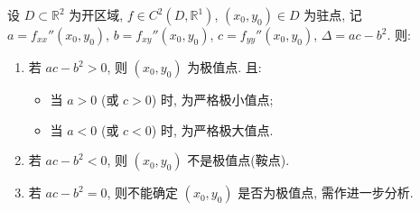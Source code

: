 \begin{corollary}\label{cor:9.2.2}
设 $D \subset \mathbb{R}^{2}$ 为开区域, $f \in C^{2}(D, \mathbb{R}^{1})$, $(x_{0}, y_{0}) \in D$ 为驻点, 记 $a = f_{xx}''(x_{0}, y_{0})$, $b = f_{xy}''(x_{0}, y_{0})$, $c = f_{yy}''(x_{0}, y_{0})$, $\Delta = ac - b^{2}$. 则:
\begin{enumerate}
  \item 若 $ac - b^{2} > 0$, 则 $(x_{0}, y_{0})$ 为极值点. 且:
  \begin{itemize}
    \item 当 $a > 0$ (或 $c > 0$) 时, 为严格极小值点;
    \item 当 $a < 0$ (或 $c < 0$) 时, 为严格极大值点.
  \end{itemize}
  \item 若 $ac - b^{2} < 0$, 则 $(x_{0}, y_{0})$ 不是极值点(鞍点).
  \item 若 $ac - b^{2} = 0$, 则不能确定 $(x_{0}, y_{0})$ 是否为极值点, 需作进一步分析.
\end{enumerate}
\end{corollary}

